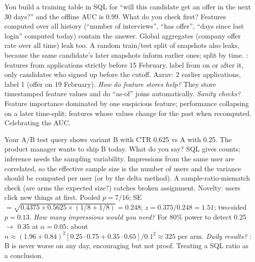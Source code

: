 \begin{qa}{\deep You build a training table in SQL for ``will this candidate get an offer in the next 30 days?'' and the offline AUC is 0.99. What do you
check first?}
\why Features computed over all history (``number of interviews'', ``has offer'', ``days since last login'' computed today) contain the answer. Global
aggregates (company offer rate over all time) leak too. A random train/test split of snapshots also leaks, because the same candidate's later snapshots
inform earlier ones; split by time.
\worked {}: features from applications strictly before 15 February, label from on or after it, only candidates who signed up
before the cutoff. Aarav: 2 earlier applications, label 1 (offer on 19 February).
\pushes \emph{How do feature stores help?} They store timestamped feature values and do ``as-of'' joins automatically. \emph{Sanity checks?} Feature
importance dominated by one suspicious feature; performance collapsing on a later time-split; features whose values change for the past when recomputed.
\pitfall Celebrating the AUC.
\end{qa}

\begin{qa}{\deep Your A/B test query shows variant B with CTR 0.625 vs A with 0.25. The product manager wants to ship B today. What do you say?}
\why SQL gives counts; inference needs the sampling variability. Impressions from the same user are correlated, so the effective sample size is the number of
users and the variance should be computed per user (or by the delta method). A sample-ratio-mismatch check (are arms the expected size?) catches broken
assignment. Novelty: users click new things at first.
\worked Pooled $p = 7/16$; SE $= \sqrt{0.4375 \times 0.5625 \times (1/8 + 1/8)} = 0.248$; $z = 0.375/0.248 = 1.51$; two-sided $p = 0.13$.
\pushes \emph{How many impressions would you need?} For 80\% power to detect 0.25 $\to$ 0.35 at $\alpha = 0.05$: about $n \approx (1.96 + 0.84)^2
[0.25\cdot0.75 + 0.35\cdot0.65]/0.1^2 \approx 325$ per arm. \emph{Daily results?} : B is never worse on any day, encouraging but
not proof.
\pitfall Treating a SQL ratio as a conclusion.
\end{qa}

